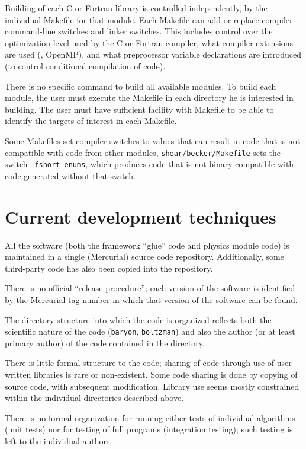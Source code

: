 \documentclass{memarticle}
\newcommand{\prog}[1]%
  {\texttt{#1}}
\newcommand{\despipe}{\name{des-pipe}\xspace}
\begin{document}
Building of each C or Fortran library is controlled independently, by
the individual Makefile for that module. Each Makefile can add or
replace compiler command-line switches and linker switches. This
includes control over the optimization level used by the C or Fortran
compiler, what compiler extensions are used (\eg, OpenMP), and what
preprocessor variable declarations are introduced (to control
conditional compilation of code).

There is no specific command to build all available modules. To build
each module, the user must execute the Makefile in each directory he is
interested in building. The user must have sufficient facility with
Makefile to be able to identify the targets of interest in each
Makefile.

Some Makefiles set compiler switches to values that can result in code
that is not compatible with code from other modules, \eg
\prog{shear/becker/Makefile} sets the switch \texttt{-fshort-enums},
which produces code that is not binary-compatible with code generated
without that switch.

\section{Current development techniques}

All the \despipe software (both the framework ``glue'' code and
physics module code) is maintained in a single (Mercurial) source code
repository. Additionally, some third-party code has also been copied
into the \despipe repository.

There is no official ``release procedure''; each version of the software
is identified by the Mercurial tag number in which that version of the
software can be found.

The directory structure into which the code is organized reflects both
the scientific nature of the code (\eg \prog{baryon}, \prog{boltzman})
and also the author (or at least primary author) of the code contained
in the directory.

There is little formal structure to the code; sharing of code through
use of user-written libraries is rare or non-existent. Some code sharing
is done by copying of source code, with subsequent modification. Library
use seems mostly constrained within the individual directories described
above.

There is no formal organization for running either tests of individual
algorithms (unit tests) nor for testing of full programs (integration
testing); such testing is left to the individual authors.
\end{document}
